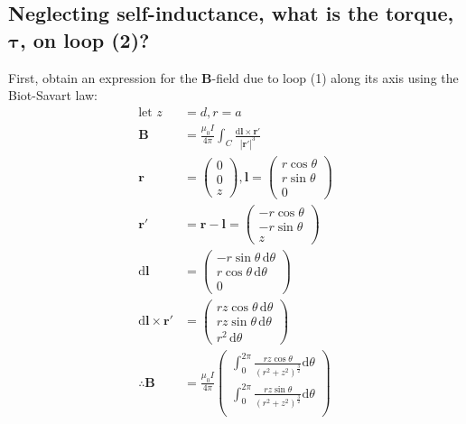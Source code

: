 \documentclass[a4paper]{scrartcl}
\begin{document}
\subsection{Neglecting self-inductance, what is the torque, \(\boldsymbol{\tau}\), on loop (2)?}
First, obtain an expression for the \(\mathbf{B}\)-field due to loop (1) along its axis using the Biot-Savart law:
\begin{align*}
    \text{let } z &= d, r = a \\
    \mathbf{B} &= \frac{\mu_0 I}{4 \pi} \int_C \frac{\mathrm{d}\mathbf{l} \times \mathbf{r}'}{|\mathbf{r}'|^3} \\
    \mathbf{r} &= \begin{pmatrix}
        0 \\
        0 \\
        z
    \end{pmatrix}, \mathbf{l} = \begin{pmatrix}
        r \cos \theta \\
        r \sin \theta \\
        0
    \end{pmatrix} \\
    \mathbf{r}' &= \mathbf{r} - \mathbf{l} = \begin{pmatrix}
        -r \cos \theta \\
        -r \sin \theta \\
        z
    \end{pmatrix} \\
    \mathrm{d}\mathbf{l} &= \begin{pmatrix}
        -r \sin \theta \,\mathrm{d}\theta \\
        r \cos \theta \,\mathrm{d}\theta \\
        0
    \end{pmatrix} \\
    \mathrm{d}\mathbf{l} \times \mathbf{r}' &= \begin{pmatrix}
        r z \cos \theta \,\mathrm{d}\theta \\
        r z \sin \theta \,\mathrm{d}\theta \\
        r^2 \,\mathrm{d}\theta
    \end{pmatrix} \\
    \therefore \mathbf{B} &= \frac{\mu_0 I}{4 \pi} \begin{pmatrix}
        \int_0^{2 \pi} \frac{r z \cos \theta}{(r^2 + z^2)^{\frac{3}{2}}} \mathrm{d}\theta \\
        \int_0^{2 \pi} \frac{r z \sin \theta}{(r^2 + z^2)^{\frac{3}{2}}} \mathrm{d}\theta \\

\end{pmatrix}
\end{align*}
\end{document}

